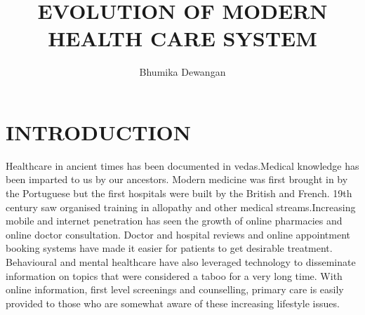 \documentclass[12pt]{article}
\author{Bhumika Dewangan}
\date{}
\title{EVOLUTION OF MODERN HEALTH CARE SYSTEM }
\begin{document}
\maketitle
\section{INTRODUCTION}
Healthcare in ancient times has been documented in vedas.Medical knowledge has been imparted to us by our ancestors. Modern medicine was first brought in by the Portuguese but the first hospitals were built by the British and French. 19th century saw organised training in allopathy and other medical streams.Increasing mobile and internet penetration has seen the growth of online pharmacies and online doctor consultation. Doctor and hospital reviews and online appointment booking systems have made it easier for patients to get desirable treatment. Behavioural and mental healthcare have also leveraged technology to disseminate information on topics that were considered a taboo for a very long time. With online information, first level screenings and counselling, primary care is easily provided to those who are somewhat aware of these increasing lifestyle issues.
\end{document}
